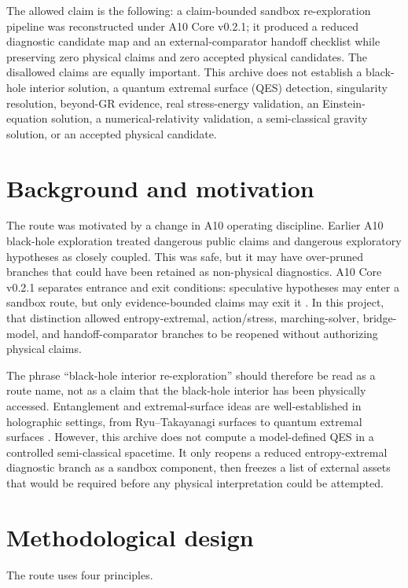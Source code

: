 \documentclass[11pt,a4paper]{article}
\begin{document}
The allowed claim is the following: a claim-bounded sandbox re-exploration pipeline was reconstructed under A10 Core v0.2.1; it produced a reduced diagnostic candidate map and an external-comparator handoff checklist while preserving zero physical claims and zero accepted physical candidates. The disallowed claims are equally important. This archive does not establish a black-hole interior solution, a quantum extremal surface (QES) detection, singularity resolution, beyond-GR evidence, real stress-energy validation, an Einstein-equation solution, a numerical-relativity validation, a semi-classical gravity solution, or an accepted physical candidate.

\section{Background and motivation}

The route was motivated by a change in A10 operating discipline. Earlier A10 black-hole exploration treated dangerous public claims and dangerous exploratory hypotheses as closely coupled. This was safe, but it may have over-pruned branches that could have been retained as non-physical diagnostics. A10 Core v0.2.1 separates entrance and exit conditions: speculative hypotheses may enter a sandbox route, but only evidence-bounded claims may exit it \cite{yoshimura2026a10core}. In this project, that distinction allowed entropy-extremal, action/stress, marching-solver, bridge-model, and handoff-comparator branches to be reopened without authorizing physical claims.

The phrase ``black-hole interior re-exploration'' should therefore be read as a route name, not as a claim that the black-hole interior has been physically accessed. Entanglement and extremal-surface ideas are well-established in holographic settings, from Ryu--Takayanagi surfaces to quantum extremal surfaces \cite{ryu2006,engelhardt2015}. However, this archive does not compute a model-defined QES in a controlled semi-classical spacetime. It only reopens a reduced entropy-extremal diagnostic branch as a sandbox component, then freezes a list of external assets that would be required before any physical interpretation could be attempted.

\section{Methodological design}

The route uses four principles.
\end{document}
